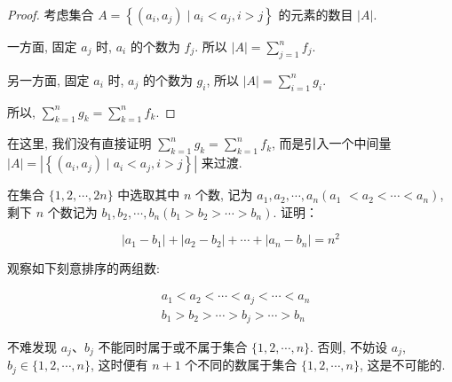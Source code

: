 \begin{proof}
	考虑集合 $A=\left\{\left(a_{i}, a_{j}\right) \mid a_{i}<a_{j}, i>j\right\}$ 的元素的数目 $|A|$.

	一方面, 固定 $a_{j}$ 时, $a_{i}$ 的个数为 $f_{j}$. 所以 $|A|=\sum_{j=1}^{n} f_{j}$.

	另一方面, 固定 $a_{i}$ 时, $a_{j}$ 的个数为 $g_{i}$, 所以 $|A|=\sum_{i=1}^{n} g_{i}$.

	所以, $\sum_{k=1}^{n} g_{k}=\sum_{k=1}^{n} f_{k}$.
\end{proof}

\begin{note}
	在这里, 我们没有直接证明 $\sum_{k=1}^{n} g_{k}=\sum_{k=1}^{n} f_{k}$, 而是引入一个中间量 $|A|=\left|\left\{\left(a_{i}, a_{j}\right) \mid a_{i}<a_{j}, i>j\right\}\right|$ 来过渡.
\end{note}

\begin{example}
	在集合 $\{1,2, \cdots, 2 n\}$ 中选取其中 $n$ 个数, 记为 $a_{1}, a_{2}, \cdots, a_{n}\left(a_{1}\right.$ $\left.<a_{2}<\cdots<a_{n}\right)$, 剩下 $n$ 个数记为 $b_{1}, b_{2}, \cdots, b_{n}\left(b_{1}>b_{2}>\cdots>b_{n}\right)$. 证明：

	$$
		\left|a_{1}-b_{1}\right|+\left|a_{2}-b_{2}\right|+\cdots+\left|a_{n}-b_{n}\right|=n^{2}
	$$
\end{example}

\begin{analysis}
	观察如下刻意排序的两组数:

	$$
		\begin{aligned}
			 & a_{1}<a_{2}<\cdots<a_{j}<\cdots<a_{n} \\
			 & b_{1}>b_{2}>\cdots>b_{j}>\cdots>b_{n}
		\end{aligned}
	$$

	不难发现 $a_{j} 、 b_{j}$ 不能同时属于或不属于集合 $\{1,2, \cdots, n\}$. 否则, 不妨设 $a_{j}$, $b_{j} \in\{1,2, \cdots, n\}$, 这时便有 $n+1$ 个不同的数属于集合 $\{1,2, \cdots, n\}$, 这是不可能的.
\end{analysis}

